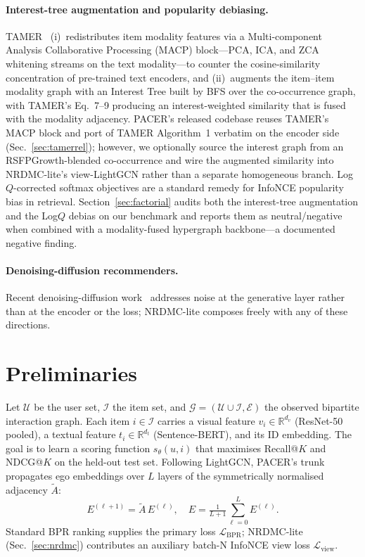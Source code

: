 \documentclass[conference]{IEEEtran}
\newcommand{\Lcal}{\mathcal{L}}
\newcommand{\Ucal}{\mathcal{U}}
\newcommand{\Ical}{\mathcal{I}}
\newcommand{\Ecal}{\mathcal{E}}
\begin{document}
\paragraph{Interest-tree augmentation and popularity debiasing.}
TAMER~\cite{meng2025tamer} (i)~redistributes item modality features
via a Multi-component Analysis Collaborative Processing (MACP)
block---PCA, ICA, and ZCA whitening streams on the text modality---to
counter the cosine-similarity concentration of pre-trained
text encoders, and (ii)~augments the item--item
modality graph with an Interest Tree built by BFS over the
co-occurrence graph, with TAMER's Eq.~7--9 producing an
interest-weighted similarity that is fused with the modality
adjacency. PACER's released codebase reuses TAMER's MACP block and
port of TAMER Algorithm~1 verbatim on the encoder side
(Sec.~\ref{sec:tamerrel}); however, we optionally source the
interest graph from an RSFPGrowth-blended co-occurrence and wire the
augmented similarity into NRDMC-lite's view-LightGCN rather than a
separate homogeneous branch. Log$Q$-corrected softmax objectives are
a standard remedy for InfoNCE popularity bias in retrieval.
Section~\ref{sec:factorial} audits both the interest-tree
augmentation and the Log$Q$ debias on our benchmark and reports them
as neutral/negative when combined with a modality-fused hypergraph
backbone---a documented negative finding.

\paragraph{Denoising-diffusion recommenders.}
Recent denoising-diffusion
work~\cite{jiang2024diffmm,jiang2024diffkg,nguyen2024diffusion}
addresses noise at the generative layer rather than at the encoder or
the loss; NRDMC-lite composes freely with any of these directions.

\section{Preliminaries}
\label{sec:prelim}

Let $\Ucal$ be the user set, $\Ical$ the item set, and $\mathcal{G} =
(\Ucal \cup \Ical, \Ecal)$ the observed bipartite interaction graph.
Each item $i \in \Ical$ carries a visual feature
$v_i \in \mathbb{R}^{d_v}$ (ResNet-50 pooled), a textual feature
$t_i \in \mathbb{R}^{d_t}$ (Sentence-BERT), and its ID embedding.
The goal is to learn a scoring function $s_\theta(u, i)$ that
maximises Recall@$K$ and NDCG@$K$ on the held-out test set. Following
LightGCN, PACER's trunk propagates ego embeddings over $L$ layers of
the symmetrically normalised adjacency $\tilde A$:
\begin{equation}
E^{(\ell+1)} = \tilde A\, E^{(\ell)},\quad
E = \tfrac{1}{L+1} \sum_{\ell=0}^{L} E^{(\ell)}.
\label{eq:lightgcn}
\end{equation}
Standard BPR ranking supplies the primary loss $\Lcal_{\text{BPR}}$;
NRDMC-lite (Sec.~\ref{sec:nrdmc}) contributes an auxiliary batch-N
InfoNCE view loss $\Lcal_{\text{view}}$.
\end{document}

